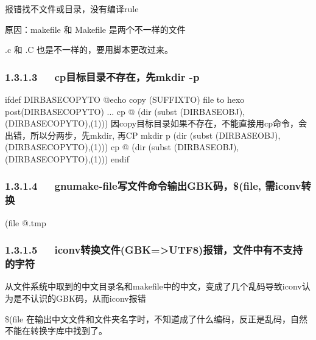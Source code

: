 \documentclass[letterpaper,12pt,english]{sphinxmanual}
\begin{document}
报错找不文件或目录，没有编译rule

原因：makefile 和 Makefile 是两个不一样的文件

.c 和 .C 也是不一样的，要用脚本更改过来。


\subsubsection{1.3.1.3   cp目标目录不存在，先mkdir -p}
\label{\detokenize{001software/001install/001._u7f51_u7ad9/travisCI:cp-mkdir-p}}
\begin{sphinxVerbatim}[commandchars=\\\{\}]
ifdef DIR\PYGZus{}BASE\PYGZus{}COPYTO
    @echo copy \PYGZdl{}(SUFFIX\PYGZus{}TO) file to \PYGZob{}hexo post\PYGZcb{}\PYGZdl{}(DIR\PYGZus{}BASE\PYGZus{}COPYTO) ...
\PYGZsh{}   cp \PYGZdl{}\PYGZdl{}@ \PYGZdl{}(dir \PYGZdl{}(subst \PYGZdl{}(DIR\PYGZus{}BASE\PYGZus{}OBJ),\PYGZdl{}(DIR\PYGZus{}BASE\PYGZus{}COPYTO),\PYGZdl{}(1)))
\PYGZsh{}因copy目标目录如果不存在，不能直接用cp命令，会出错，所以分两步，先mkdir, 再CP
    mkdir \PYGZhy{}p \PYGZdl{}(dir \PYGZdl{}(subst \PYGZdl{}(DIR\PYGZus{}BASE\PYGZus{}OBJ),\PYGZdl{}(DIR\PYGZus{}BASE\PYGZus{}COPYTO),\PYGZdl{}(1)))
    cp \PYGZdl{}\PYGZdl{}@ \PYGZdl{}(dir \PYGZdl{}(subst \PYGZdl{}(DIR\PYGZus{}BASE\PYGZus{}OBJ),\PYGZdl{}(DIR\PYGZus{}BASE\PYGZus{}COPYTO),\PYGZdl{}(1)))
endif
\end{sphinxVerbatim}


\subsubsection{1.3.1.4   gnumake-file写文件命令输出GBK码，\$(file, 需iconv转换}
\label{\detokenize{001software/001install/001._u7f51_u7ad9/travisCI:gnumake-filegbk-file-iconv}}
\begin{sphinxVerbatim}[commandchars=\\\{\}]
\PYGZdl{}(file \PYGZgt{}\PYGZdl{}\PYGZdl{}@.tmp
\end{sphinxVerbatim}


\subsubsection{1.3.1.5   iconv转换文件(GBK=\textgreater{}UTF8)报错，文件中有不支持的字符}
\label{\detokenize{001software/001install/001._u7f51_u7ad9/travisCI:iconv-gbk-utf8}}
从文件系统中取到的中文目录名和makefile中的中文，变成了几个乱码导致iconv认为是不认识的GBK码，从而iconv报错

\$(file 在输出中文文件和文件夹名字时，不知道成了什么编码，反正是乱码，自然不能在转换字库中找到了。
\end{document}
